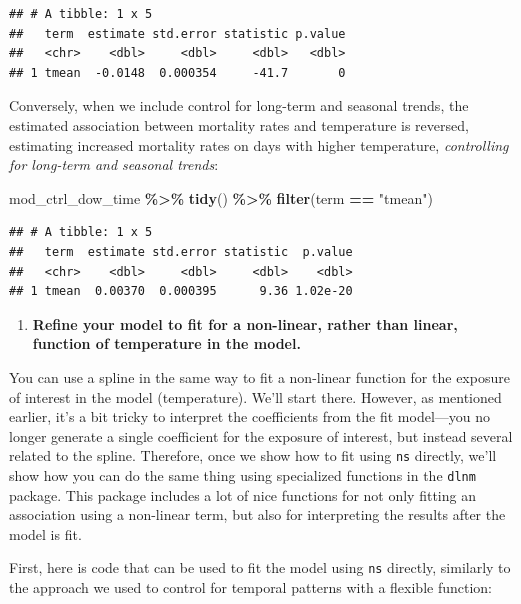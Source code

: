 \documentclass[
]{book}
\newenvironment{Shaded}{\begin{snugshade}}{\end{snugshade}}
\newcommand{\FunctionTok}[1]{\textcolor[rgb]{0.13,0.29,0.53}{\textbf{#1}}}
\newcommand{\NormalTok}[1]{#1}
\newcommand{\SpecialCharTok}[1]{\textcolor[rgb]{0.81,0.36,0.00}{\textbf{#1}}}
\newcommand{\StringTok}[1]{\textcolor[rgb]{0.31,0.60,0.02}{#1}}
\providecommand{\tightlist}{%
  \setlength{\itemsep}{0pt}\setlength{\parskip}{0pt}}
\begin{document}
\begin{verbatim}
## # A tibble: 1 x 5
##   term  estimate std.error statistic p.value
##   <chr>    <dbl>     <dbl>     <dbl>   <dbl>
## 1 tmean  -0.0148  0.000354     -41.7       0
\end{verbatim}

Conversely, when we include control for long-term and seasonal trends, the
estimated association between mortality rates and temperature is reversed,
estimating increased mortality rates on days with higher temperature, \emph{controlling
for long-term and seasonal trends}:

\begin{Shaded}
\begin{Highlighting}[]
\NormalTok{mod\_ctrl\_dow\_time }\SpecialCharTok{\%\textgreater{}\%} 
  \FunctionTok{tidy}\NormalTok{() }\SpecialCharTok{\%\textgreater{}\%} 
  \FunctionTok{filter}\NormalTok{(term }\SpecialCharTok{==} \StringTok{"tmean"}\NormalTok{)}
\end{Highlighting}
\end{Shaded}

\begin{verbatim}
## # A tibble: 1 x 5
##   term  estimate std.error statistic  p.value
##   <chr>    <dbl>     <dbl>     <dbl>    <dbl>
## 1 tmean  0.00370  0.000395      9.36 1.02e-20
\end{verbatim}

\begin{enumerate}
\def\labelenumi{\arabic{enumi}.}
\setcounter{enumi}{2}
\tightlist
\item
  \textbf{Refine your model to fit for a non-linear, rather than linear, function
  of temperature in the model.}
\end{enumerate}

You can use a spline in the same way to fit a non-linear function for the
exposure of interest in the model (temperature). We'll start there. However,
as mentioned earlier, it's a bit tricky to interpret the coefficients from the
fit model---you no longer generate a single coefficient for the exposure of
interest, but instead several related to the spline. Therefore, once we show
how to fit using \texttt{ns} directly, we'll show how you can do the same thing using
specialized functions in the \texttt{dlnm} package. This package includes a lot of
nice functions for not only fitting an association using a non-linear term,
but also for interpreting the results after the model is fit.

First, here is code that can be used to fit the model using \texttt{ns} directly,
similarly to the approach we used to control for temporal patterns with a
flexible function:
\end{document}
